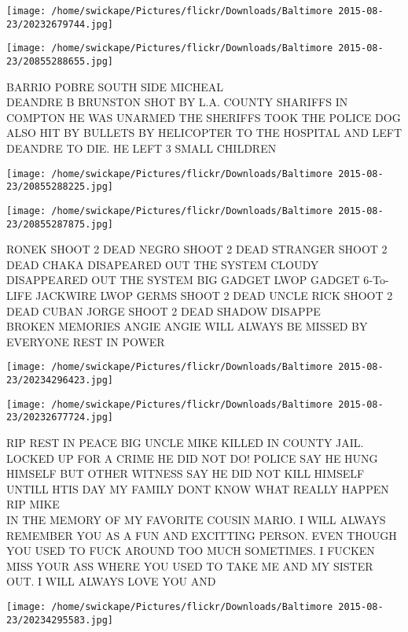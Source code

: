 \documentclass[10pt,letterpaper]{article}
\begin{document}
\texttt{[image: /home/swickape/Pictures/flickr/Downloads/Baltimore 2015-08-23/20232679744.jpg]}

\vspace{0.25in}
\texttt{[image: /home/swickape/Pictures/flickr/Downloads/Baltimore 2015-08-23/20855288655.jpg]}

BARRIO POBRE SOUTH SIDE MICHEAL\\
DEANDRE B BRUNSTON SHOT BY L.A. COUNTY SHARIFFS IN COMPTON HE WAS UNARMED THE SHERIFFS TOOK THE POLICE DOG ALSO HIT BY BULLETS BY HELICOPTER TO THE HOSPITAL AND LEFT DEANDRE TO DIE.  HE LEFT 3 SMALL CHILDREN\\
\pagebreak

\texttt{[image: /home/swickape/Pictures/flickr/Downloads/Baltimore 2015-08-23/20855288225.jpg]}

\vspace{0.25in}
\texttt{[image: /home/swickape/Pictures/flickr/Downloads/Baltimore 2015-08-23/20855287875.jpg]}

RONEK SHOOT 2 DEAD NEGRO SHOOT 2 DEAD STRANGER SHOOT 2 DEAD CHAKA DISAPEARED OUT THE SYSTEM CLOUDY DISAPPEARED OUT THE SYSTEM BIG GADGET LWOP GADGET 6{-}To{-}LIFE JACKWIRE LWOP GERMS SHOOT 2 DEAD UNCLE RICK SHOOT 2 DEAD CUBAN JORGE SHOOT 2 DEAD SHADOW DISAPPE\\
BROKEN MEMORIES ANGIE ANGIE WILL ALWAYS BE MISSED BY EVERYONE REST IN POWER\\
\pagebreak

\texttt{[image: /home/swickape/Pictures/flickr/Downloads/Baltimore 2015-08-23/20234296423.jpg]}

\vspace{0.25in}
\texttt{[image: /home/swickape/Pictures/flickr/Downloads/Baltimore 2015-08-23/20232677724.jpg]}

RIP REST IN PEACE BIG UNCLE MIKE KILLED IN COUNTY JAIL.  LOCKED UP FOR A CRIME HE DID NOT DO!  POLICE SAY HE HUNG HIMSELF BUT OTHER WITNESS SAY HE DID NOT KILL HIMSELF UNTILL HTIS DAY MY FAMILY DONT KNOW WHAT REALLY HAPPEN RIP MIKE\\
IN THE MEMORY OF MY FAVORITE COUSIN MARIO.  I WILL ALWAYS REMEMBER YOU AS A FUN AND EXCITTING PERSON.  EVEN THOUGH YOU USED TO FUCK AROUND TOO MUCH SOMETIMES.  I FUCKEN MISS YOUR ASS WHERE YOU USED TO TAKE ME AND MY SISTER OUT.  I WILL ALWAYS LOVE YOU AND\\
\pagebreak

\texttt{[image: /home/swickape/Pictures/flickr/Downloads/Baltimore 2015-08-23/20234295583.jpg]}
\end{document}
